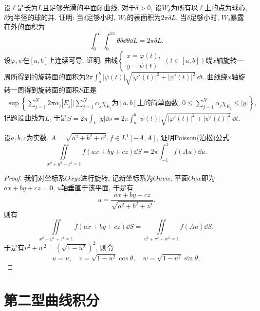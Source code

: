 \begin{quiza}
\begin{solution}
\end{solution}
\woe 设\(\ell\)是长为\(L\)且足够光滑的平面闭曲线. 对于\(\delta>0\), 设\(W_{\delta}\)为所有以\(\ell\)上的点为球心, \(\delta\)为半径的球的并. 证明: 当\(\delta\)足够小时, \(W_{\delta}\)的表面积为\(2\pi\delta L\).
\tcbline
当\(\delta\)足够小时, \(W_\delta\)暴露在外的面积为\[\int_{0}^{L}\int_{0}^{2\pi}\theta\delta\dd\theta\dd L=2\pi\delta L.\]
\tcbline
\woe 设\(\varphi,\psi\)在\([a,b]\)上连续可导. 证明: 曲线\(\begin{cases}
x=\varphi(t),\\y=\psi(t)
\end{cases}(t\in[a,b])\)绕\(x\)轴旋转一周所得到的旋转面的面积为\(2\pi\int_{a}^{b}|\psi(t)|\sqrt{|\varphi'(t)|^2+|\psi'(t)|^2}\,\dd t\).
\tcbline
曲线绕\(x\)轴旋转一周得到旋转面的面积\(S\)正是\[\begin{split}
\sup\left\lbrace\sum_{j=1}^{N}2\pi \alpha_j\left|E_j\right|\Big|\sum_{j=1}^{N}\alpha_j\chi_{E_j}\text{为}[a,b]\text{上的简单函数, }0\leqslant\sum_{j=1}^{N}\alpha_j\chi_{E_j}\leqslant|y|\right\rbrace,
\end{split}\]记题设曲线为\(L\), 于是\(S=2\pi\int_L|y|\dd s=2\pi\int_{a}^{b}|\psi(t)|\sqrt{|\varphi'(t)|^2+|\psi'(t)|^2}\,\dd t.\)
\end{quiza}

\begin{quizb}
\woe 设\(a,b,c\)为实数, \(A=\sqrt{a^2+b^2+c^2}, f\in L^1[-A,A]\), 证明Poisson(泊松)公式\[\iint\limits_{x^2+y^2+z^2=1}f(ax+by+cz)\dd S=2\pi\int_{-1}^{1}f(Au)\dd u.\]
\begin{proof}
我们对坐标系\(Oxyz\)进行旋转, 记新坐标系为\(Ouvw\), 平面\(Ovw\)即为\(ax+by+cz=0\), \(u\)轴垂直于该平面, 于是有 \[u=\frac{ax+by+cz}{\sqrt{a^2+b^2+z^2}}.\]则有\[\iint\limits_{x^2+y^2+z^2=1}f(ax+by+cz)\dd S=\iint\limits_{u^2+v^2+w^2=1}f(Au)\dd S,\]于是有\(v^2+w^2=\left(\sqrt{1-u^2}\right)^2\), 则令\[u=u,\quad v=\sqrt{1-u^2}\cos\theta,\quad w=\sqrt{1-u^2}\sin\theta,\]
\end{proof}

\end{quizb}
\section{第二型曲线积分}

